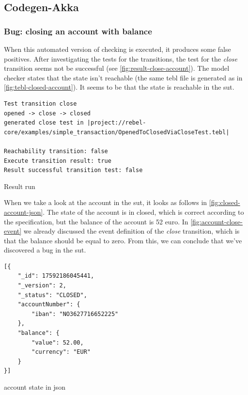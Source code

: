 \subsection{Codegen-Akka}

\subsubsection{Bug: closing an account with balance}\label{sec:bug-close-account}
When this automated version of checking is executed, it produces some false
positives. After investigating the tests for the transitions, the test for the \textit{close}
transition seems not be successful (see \autoref{fig:result-close-account}).
The model checker states that the state isn't reachable (the same tebl file is
generated as in \autoref{fig:tebl-closed-account}). It seems to be that the
state is reachable in the \gls{sut}.

\begin{sourcecode}[h!]
\begin{lstlisting}[]
Test transition close
opened -> close -> closed
generated close test in |project://rebel-core/examples/simple_transaction/OpenedToClosedViaCloseTest.tebl|

Reachability transition: false
Execute transition result: true
Result successful transition test: false
\end{lstlisting}
\caption{Result run}\label{fig:result-close-account}
\end{sourcecode}
\FloatBarrier

When we take a look at the account in the \gls{sut}, it looks as
follows in \autoref{fig:closed-account-json}. The state of the account is in
closed, which is correct according to the specification, but the balance of the
account is 52 euro. In \autoref{fig:account-close-event} we already discussed
the event  definition of the \textit{close} transition, which is that the
balance should be equal to zero. From this, we can conclude that we've
discovered a bug in the \gls{sut}.

\begin{sourcecode}[h!]
\begin{lstlisting}[]
[{
	"_id": 17592186045441,
	"_version": 2,
	"_status": "CLOSED",
	"accountNumber": {
		"iban": "NO3627716652225"
	},
	"balance": {
		"value": 52.00,
		"currency": "EUR"
	}
}]
\end{lstlisting}
\caption{account state in json}\label{fig:closed-account-json}
\end{sourcecode}
\FloatBarrier

